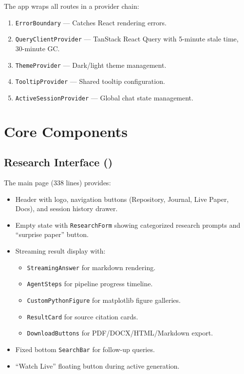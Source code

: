 The app wraps all routes in a provider chain:

\begin{enumerate}
  \item \texttt{ErrorBoundary} --- Catches React rendering errors.
  \item \texttt{QueryClientProvider} --- TanStack React Query with 5-minute stale time, 30-minute GC.
  \item \texttt{ThemeProvider} --- Dark/light theme management.
  \item \texttt{TooltipProvider} --- Shared tooltip configuration.
  \item \texttt{ActiveSessionProvider} --- Global chat state management.
\end{enumerate}

\section{Core Components}
\label{sec:frontend:components}

\subsection{Research Interface ()}

The main page (338 lines) provides:

\begin{itemize}
  \item Header with logo, navigation buttons (Repository, Journal, Live Paper, Docs), and session history drawer.
  \item Empty state with \texttt{ResearchForm} showing categorized research prompts and ``surprise paper'' button.
  \item Streaming result display with:
  \begin{itemize}
    \item \texttt{StreamingAnswer} for markdown rendering.
    \item \texttt{AgentSteps} for pipeline progress timeline.
    \item \texttt{CustomPythonFigure} for matplotlib figure galleries.
    \item \texttt{ResultCard} for source citation cards.
    \item \texttt{DownloadButtons} for PDF/DOCX/HTML/Markdown export.
  \end{itemize}
  \item Fixed bottom \texttt{SearchBar} for follow-up queries.
  \item ``Watch Live'' floating button during active generation.
\end{itemize}

